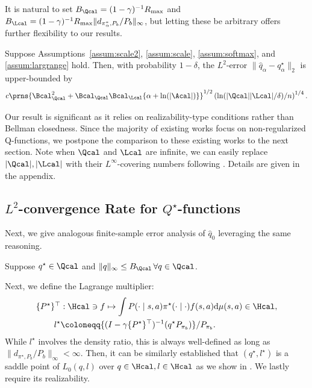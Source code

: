 It is natural to set $B_{\Qcal}=(1-\gamma)^{-1}R_{\max}$ and $B_{\Lcal}=(1-\gamma)^{-1}R_{\max}\|d_{\pi^*_{\alpha},P_b}/P_b\|_{\infty}$, but letting these be arbitrary offers further flexibility to our results.


\begin{theorem}\label{thm:convergence_soft}
Suppose Assumptions~\ref{assum:scale2}, \ref{assum:scale}, \ref{assum:softmax}, and \ref{assum:largrange} hold. Then, with probability $1-\delta$, the $L^2$-error $\|\hat q_{\alpha}-q^{\star}_{\alpha}\|_2$ is upper-bounded by $$
 c \prns{  \Bcal^2_{\Qcal}+\Bcal_{\Qcal}\Bcal_{\Lcal}\{\alpha+\ln(|\Acal|)\}}^{1/2} \left(  \ln(|\Qcal||\Lcal|/\delta)/n\right)^{1/4}.  $$
\end{theorem}

Our result is significant as it relies on realizability-type conditions rather than Bellman closedness. Since the majority of existing works focus on non-regularized Q-functions, we postpone the comparison to these existing works to the next section.
 Note when $\Qcal$ and $\Lcal$ are infinite, we can easily replace $|\Qcal|,|\Lcal|$ with their $L^{\infty}$-covering numbers following \citet{uehara2021finite}. Details are given in the appendix.  


\subsection{$L^2$-convergence Rate for  $Q^{\star}$-functions}


Next, we give analogous finite-sample error analysis of $\hat q_0$ leveraging the same reasoning.  

\begin{assum}\label{assum:q_star}
Suppose $q^{\star}\in \Qcal$ and $\|q\|_{\infty}\leq B_{\Qcal}\,\forall q\in \Qcal$. 
\end{assum}


Next, we define the Lagrange multiplier:
\begin{align*}
   \textstyle \{P^{\star}\}^{\top}&:\Hcal \ni f \mapsto \int P(\cdot\mid s,a)\pi^{\star}(\cdot\mid \cdot)f(s,a)\mathrm{d}\mu(s,a)\in \Hcal, 
\\
l^{\star} &\coloneqq \{(I-\gamma \{P^{\star}\}^{\top})^{-1 }(q^{\star}P_{\pi_b})\}/P_{\pi_b}.
\end{align*}
{\finaledit While $l^{\star} $ involves the density ratio, this is always well-defined as long as $\|d_{\pi^{\star},{P_b}}/P_b\|_{\infty}<\infty$. %
} Then, it can be similarly established that $(q^{\star},l^{\star})$ is a saddle point of $L_0(q,l)$ over $q\in \Hcal,l\in \Hcal$ as we show in . We lastly require its realizability.




